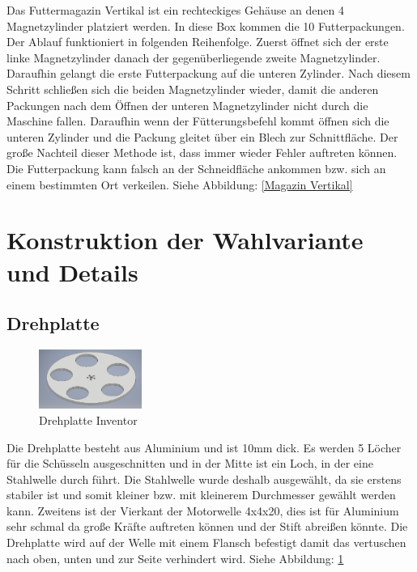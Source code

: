 Das Futtermagazin Vertikal ist ein rechteckiges Gehäuse an denen 4 Magnetzylinder platziert werden. In diese Box kommen die 10 Futterpackungen. Der Ablauf funktioniert in folgenden Reihenfolge. Zuerst öffnet sich der erste linke Magnetzylinder danach der gegenüberliegende zweite Magnetzylinder. Daraufhin gelangt die erste Futterpackung auf die unteren Zylinder. Nach diesem Schritt schließen sich die beiden Magnetzylinder wieder, damit die anderen Packungen nach dem Öffnen der unteren Magnetzylinder nicht durch die Maschine fallen. Daraufhin wenn der Fütterungsbefehl kommt öffnen sich die unteren Zylinder und die Packung gleitet über ein Blech zur Schnittfläche. Der große Nachteil dieser Methode ist, dass immer wieder Fehler auftreten können. Die Futterpackung kann falsch an der Schneidfläche ankommen bzw. sich an einem bestimmten Ort verkeilen. Siehe Abbildung: \ref{Magazin Vertikal}


\section{Konstruktion der Wahlvariante und Details}

\subsection{Drehplatte}

\begin{figure}
\vspace{-20pt}
  \begin{center}
    \includegraphics[width=0.30\textwidth]{Bilder/Inventor/Drehplatte}
  \end{center}
  \caption{Drehplatte Inventor}
  \label{Drehplatte_Inventor}
  \vspace{-10pt}
\end{figure}

Die Drehplatte besteht aus Aluminium und ist 10mm dick. Es werden 5 Löcher für die Schüsseln ausgeschnitten und in der Mitte ist ein Loch, in der eine Stahlwelle durch führt. Die Stahlwelle wurde deshalb ausgewählt, da sie erstens stabiler ist und somit kleiner bzw. mit kleinerem Durchmesser gewählt werden kann. Zweitens ist der Vierkant der Motorwelle 4x4x20, dies ist für Aluminium sehr schmal da große Kräfte auftreten können und der Stift abreißen könnte. Die Drehplatte wird auf der Welle mit einem Flansch befestigt damit das vertuschen nach oben, unten und zur Seite verhindert wird. Siehe Abbildung: \ref{Drehplatte_Inventor} \\

